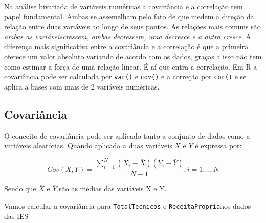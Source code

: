 \documentclass[11pt,]{style/krantz}
\makeatletter
\newenvironment{Shaded}{\begin{snugshade}}{\end{snugshade}}
\newcommand{\DataTypeTok}[1]{\textcolor[rgb]{0.13,0.29,0.53}{#1}}
\newcommand{\KeywordTok}[1]{\textcolor[rgb]{0.13,0.29,0.53}{\textbf{#1}}}
\newcommand{\NormalTok}[1]{#1}
\newcommand{\OperatorTok}[1]{\textcolor[rgb]{0.81,0.36,0.00}{\textbf{#1}}}
\newcommand{\OtherTok}[1]{\textcolor[rgb]{0.56,0.35,0.01}{#1}}
\newcommand{\StringTok}[1]{\textcolor[rgb]{0.31,0.60,0.02}{#1}}
\newenvironment{kframe}{%
\medskip{}
\setlength{\fboxsep}{.8em}
 \def\at@end@of@kframe{}%
 \ifinner\ifhmode%
  \def\at@end@of@kframe{\end{minipage}}%
  \begin{minipage}{\columnwidth}%
 \fi\fi%
 \def\FrameCommand##1{\hskip\@totalleftmargin \hskip-\fboxsep
 \colorbox{shadecolor}{##1}\hskip-\fboxsep
     \hskip-\linewidth \hskip-\@totalleftmargin \hskip\columnwidth}%
 \MakeFramed {\advance\hsize-\width
   \@totalleftmargin\z@ \linewidth\hsize
   \@setminipage}}%
 {\par\unskip\endMakeFramed%
 \at@end@of@kframe}
\renewenvironment{Shaded}{\begin{kframe}}{\end{kframe}}
\theoremstyle{definition}
\theoremstyle{definition}
\theoremstyle{definition}
\theoremstyle{remark}
\let\BeginKnitrBlock\begin \let\EndKnitrBlock\end
\makeatother
\begin{document}
Na análise bivariada de variáveis numéricas a covariância e a correlação tem papel fundamental. Ambas se assemelham pelo fato de que medem a direção da relação entre duas variáveis ao longo de seus pontos. As relações mais comuns são \emph{ambas as variáveiscrescem, ambas decrescem, uma decresce e a outra cresce}. A diferença mais significativa entre a covariância e a correlação é que a primeira oferece um valor absoluto variando de acordo com os dados, graças a isso não tem como estimar a força de uma relação linear. É aí que entra a correlação. Em R a covariância pode ser calculada por \texttt{var()} e \texttt{cov()} e a correção por \texttt{cor()} e se aplica a bases com mais de 2 variáveis numéricas.

\hypertarget{covariancia}{%
\subsection{Covariância}\label{covariancia}}

O conceito de covariância pode ser aplicado tanto a conjunto de dados como a variáveis aleatórias. Quando aplicada a duas variáveis \(X\) e \(Y\) é expressa por:

\[Cov(X,Y) = \frac {\sum_{i=1}^N(X_i-\bar X)(Y_i - \bar Y)}{N-1}, i=1,..,N\]

Sendo que \(\bar X\) e \(\bar Y\) são as médias das variáveis X e Y.

\BeginKnitrBlock{example}
\protect\hypertarget{exm:unnamed-chunk-102}{}{\label{exm:unnamed-chunk-102} }Vamos calcular a covariância para \texttt{TotalTecnicos} e \texttt{ReceitaPropria}nos dados das IES
\EndKnitrBlock{example}

\begin{Shaded}
\end{Shaded}
\end{document}
